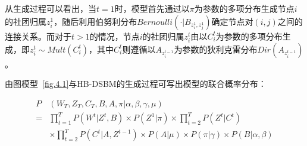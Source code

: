 从生成过程可以看出，当$t=1$时，模型首先通过以$\pi$为参数的多项分布生成节点$i$的社团归属$z_i^1$，随后利用伯努利分布$Bernoulli(\cdot|B_{z_i^1,z_j^1})$确定节点对$(i,j)$之间的连接关系。而对于$t>1$的情况，节点$i$的社团归属$z_i^t$由以$C_i^t$为参数的多项分布生成，即$z_i^t \sim Mult({C}_i^t)$，其中$C_i^t$则遵循以$A_{z_i^{t-1}}$为参数的狄利克雷分布$Dir(A_{z_i^{t-1}})$。

由图模型~\ref{fig.4.1}与HB-DSBM的生成过程可写出模型的联合概率分布：

\begin{equation}
\begin{split}
P&(W_T, Z_T, C_T, B, A, \pi | \alpha, \beta, \gamma, \mu) \\
= & \prod_{t=1}^T P(W^t | Z^t, B) \times  P(Z^1 | \pi) \times \prod_{t=2}^T P(Z^t | C^t) \\
& \times \prod_{t=2}^T P(C^t | A, Z^{t-1}) \times P(A | \mu) \times P(\pi | \gamma) \times P(B | \alpha, \beta) \\
\end{split}
\end{equation}






